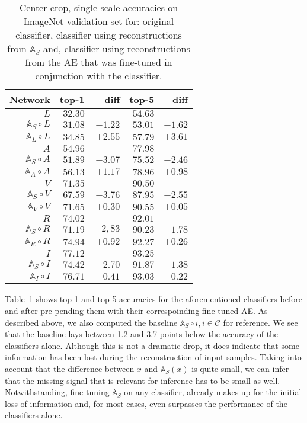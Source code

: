 \documentclass[10pt,twocolumn,a4paper]{article}
\newcommand{\autoe}[1]{\mathbb{A}_{#1}}
\newcommand{\clf}[1]{#1}
\newcommand{\nn}[2]{\autoe{#1}\circ\clf{#2}}
\begin{document}
\begin{table}
	\caption{Center-crop, single-scale accuracies on ImageNet validation set for: original classifier, classifier using reconstructions from $\autoe{S}$ and, classifier using reconstructions from the AE that was fine-tuned in conjunction with the classifier.}
	\label{tab:accuracy-classifiers}
	\hspace*{\fill}\begin{tabular}{rrrrr}
	\toprule
	Network            & top-1 & diff      & top-5 & diff \\
	\midrule
	$L$            & $32.30$        &   & $54.63$ &          \\
	$\nn{S}{L}$     & $31.08$ & $-1.22$ & $53.01$ &$-1.62$ \\
	$\nn{L}{L}$     & $34.85$ & $+2.55$ & $57.79$ & $+3.61$ \\
	\midrule
	$A$            & $54.96$      &     & $77.98$   &        \\
	$\nn{S}{A}$     & $51.89$ & $-3.07$ & $75.52$ &$-2.46$ \\
	$\nn{A}{A}$     & $56.13$ & $+1.17$ & $78.96$ &$+0.98$ \\
	\midrule
	$V$          & $71.35$ & &$90.50$ &\\
	$\nn{S}{V}$   & $67.59$ &$-3.76$ & $87.95$ &$-2.55$ \\
	$\nn{V}{V}$   & $71.65$ &$+0.30$ & $90.55$& $+0.05$ \\
	\midrule
	$R$          & $74.02$ && $92.01$& \\
	$\nn{S}{R}$   & $71.19$ &$-2,83$ & $90.23$ &$-1.78$ \\
	$\nn{R}{R}$   & $74.94$ &$+0.92$ & $92.27$ &$+0.26$ \\
	\midrule
	$I$       & $77.12$ && $93.25$& \\
	$\nn{S}{I}$& $74.42$ & $-2.70$ & $91.87$ & $-1.38$ \\
	$\nn{I}{I}$& $76.71$ & $-0.41$ & $93.03$ & $-0.22$ \\
	\bottomrule
\end{tabular}\hspace*{\fill}
\end{table}Table~\ref{tab:accuracy-classifiers} shows top-1 and top-5 accuracies for the aforementioned classifiers before and after pre-pending them with their correspoinding fine-tuned AE.
As described above, we also computed the baseline $\nn{S}{i}, i\in \mathcal{C}$ for reference.
We see that the baseline lays between 1.2 and 3.7 points below the accuracy of the classifiers alone.
Although this is not a dramatic drop, it does indicate that some information has been lost during the reconstruction of input samples.
Taking into account that the difference between $x$ and $\autoe{S}(x)$ is quite small, we can infer that the missing signal that is relevant for inference has to be small as well.
Notwithstanding, fine-tuning $\autoe{S}$ on any classifier, already makes up for the initial loss of information and, for most cases, even surpasses the performance of the classifiers alone.
\end{document}
